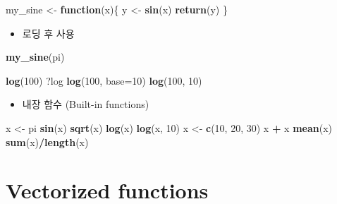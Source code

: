 \documentclass[
]{book}
\newenvironment{Shaded}{\begin{snugshade}}{\end{snugshade}}
\newcommand{\ControlFlowTok}[1]{\textcolor[rgb]{0.13,0.29,0.53}{\textbf{#1}}}
\newcommand{\DataTypeTok}[1]{\textcolor[rgb]{0.13,0.29,0.53}{#1}}
\newcommand{\DecValTok}[1]{\textcolor[rgb]{0.00,0.00,0.81}{#1}}
\newcommand{\KeywordTok}[1]{\textcolor[rgb]{0.13,0.29,0.53}{\textbf{#1}}}
\newcommand{\NormalTok}[1]{#1}
\newcommand{\OperatorTok}[1]{\textcolor[rgb]{0.81,0.36,0.00}{\textbf{#1}}}
\newcommand{\StringTok}[1]{\textcolor[rgb]{0.31,0.60,0.02}{#1}}
\providecommand{\tightlist}{%
  \setlength{\itemsep}{0pt}\setlength{\parskip}{0pt}}
\begin{document}
\begin{Shaded}
\begin{Highlighting}[]
\NormalTok{my\_sine <{-}}\StringTok{ }\ControlFlowTok{function}\NormalTok{(x)\{}
\NormalTok{	y <{-}}\StringTok{ }\KeywordTok{sin}\NormalTok{(x)}
	\KeywordTok{return}\NormalTok{(y)}
\NormalTok{\}}
\end{Highlighting}
\end{Shaded}

\begin{itemize}
\tightlist
\item
  로딩 후 사용
\end{itemize}

\begin{Shaded}
\begin{Highlighting}[]
\KeywordTok{my\_sine}\NormalTok{(pi)}
\end{Highlighting}
\end{Shaded}

\begin{Shaded}
\begin{Highlighting}[]
\KeywordTok{log}\NormalTok{(}\DecValTok{100}\NormalTok{)}
\NormalTok{?log}
\KeywordTok{log}\NormalTok{(}\DecValTok{100}\NormalTok{, }\DataTypeTok{base=}\DecValTok{10}\NormalTok{)}
\KeywordTok{log}\NormalTok{(}\DecValTok{100}\NormalTok{, }\DecValTok{10}\NormalTok{)}
\end{Highlighting}
\end{Shaded}

\begin{itemize}
\tightlist
\item
  내장 함수 (Built-in functions)
\end{itemize}

\begin{Shaded}
\begin{Highlighting}[]
\NormalTok{x <{-}}\StringTok{ }\NormalTok{pi}
\KeywordTok{sin}\NormalTok{(x)}
\KeywordTok{sqrt}\NormalTok{(x)}
\KeywordTok{log}\NormalTok{(x)}
\KeywordTok{log}\NormalTok{(x, }\DecValTok{10}\NormalTok{)}
\NormalTok{x <{-}}\StringTok{ }\KeywordTok{c}\NormalTok{(}\DecValTok{10}\NormalTok{, }\DecValTok{20}\NormalTok{, }\DecValTok{30}\NormalTok{)}
\NormalTok{x }\OperatorTok{+}\StringTok{ }\NormalTok{x}
\KeywordTok{mean}\NormalTok{(x)}
\KeywordTok{sum}\NormalTok{(x)}\OperatorTok{/}\KeywordTok{length}\NormalTok{(x)}
\end{Highlighting}
\end{Shaded}

\hypertarget{vectorized-functions}{%
\section{Vectorized functions}\label{vectorized-functions}}
\end{document}
